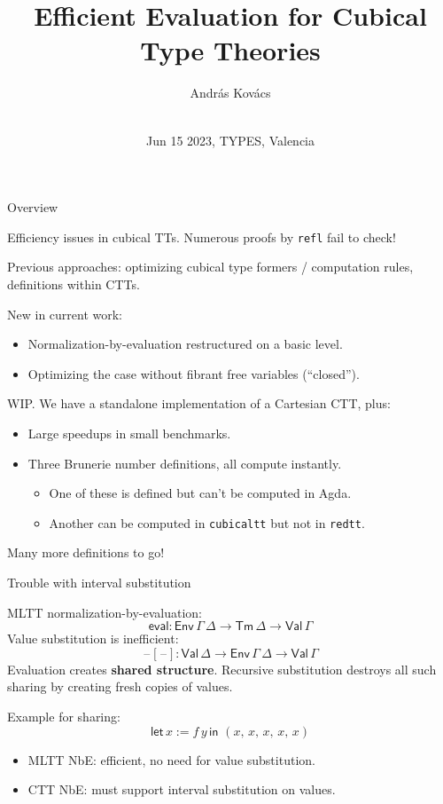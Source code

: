 \documentclass[dvipsnames]{beamer}
\title{Efficient Evaluation for Cubical Type Theories}
\author{András Kovács\inst{1} \\ \vspace{0.5em}{\small j.w.w. Evan Cavallo, Tom Jack, Anders Mörtberg} \\}
\institute{
  \inst{1}%
       {Eötvös Loránd University}
}
\date{Jun 15 2023, TYPES, Valencia}
\newcommand{\ms}[1]{\mathsf{#1}}
\newcommand{\Tm}{\mathsf{Tm}}
\newcommand{\blank}{\mathord{\hspace{1pt}\text{--}\hspace{1pt}}}
\newcommand{\Env}{\ms{Env}}
\newcommand{\Val}{\ms{Val}}
\newcommand{\eval}{\ms{eval}}
\begin{document}
\frame{\titlepage}

\begin{frame}{Overview}

Efficiency issues in cubical TTs. Numerous proofs by \texttt{refl} fail to check!
\vspace{1em}
\pause

Previous approaches: optimizing cubical type formers / computation rules,
definitions within CTTs.
\vspace{0.5em}
\pause

New in current work:
\begin{itemize}
  \item Normalization-by-evaluation restructured on a basic level.
  \item Optimizing the case without fibrant free variables (``closed'').
\end{itemize}
\vspace{0.5em}
\pause

WIP. We have a standalone implementation of a Cartesian CTT, plus:
\begin{itemize}
  \item Large speedups in small benchmarks.
  \pause
  \item Three Brunerie number definitions, all compute instantly.
    \begin{itemize}
      \pause
      \item One of these is defined but can't be computed in Agda.
      \pause
      \item Another can be computed in \texttt{cubicaltt} but not
            in \texttt{redtt}.
    \end{itemize}
\end{itemize}
\vspace{0.5em}
\pause
Many more definitions to go!
\end{frame}

\begin{frame}{Trouble with interval substitution}

MLTT normalization-by-evaluation:
\[ \eval          : \Env\,\Gamma\,\Delta \to \Tm\,\Delta \to \Val\,\Gamma \]
Value substitution is inefficient:
\[ \blank[\blank] : \Val\,\Delta \to \Env\,\Gamma\,\Delta \to \Val\,\Gamma \]
\pause
Evaluation creates \textbf{shared structure}. Recursive substitution
destroys all such sharing by creating fresh copies of values.
\vspace{1em}

Example for sharing:
\[ \ms{let}\,x := f\,y\,\ms{in}\,\,(x,\,x,\,x,\,x,\,x) \]
\pause
\vspace{-2em}
\begin{itemize}
\item MLTT NbE: efficient, no need for value substitution.
\pause
\item CTT NbE: \alert{must} support interval substitution on values.
\end{itemize}
\end{frame}
\end{document}
